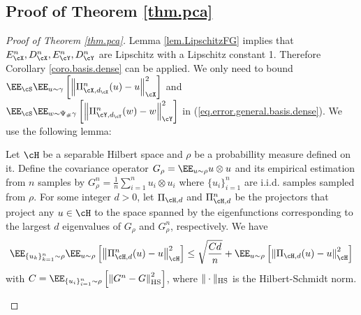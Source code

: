 \documentclass[11pt]{article} %
\begin{document}
\subsection{Proof of Theorem \ref{thm.pca}}
\label{thm.pca.proof}
\begin{proof}[Proof of Theorem \ref{thm.pca}]
Lemma \ref{lem.LipschitzFG} implies that $E_{\cX}^n,D_{\cX}^n,E_{\cY}^n,D_{\cY}^n$ are Lipschitz with a Lipschitz constant 1. Therefore Corollary \ref{coro.basis.dense} can be applied.
We only need to bound $\EE_{\cS}\EE_{u\sim \gamma}\left[\left\| \Pi_{\cX,d_{\cX}}^n(u)- u\right\|_{\cX}^2\right]$ and $\EE_{\cS}\EE_{w\sim \Psi_{\#}\gamma}\left[\left\|\Pi_{\cY,d_{\cY}}^n(w)- w\right\|_{\cY}^2\right]$ in (\ref{eq.error.general.basis.dense}).
We use the following lemma:
\begin{lemma}\label{lem.PCA.empirical}
	Let $\cH$ be a separable Hilbert space and $\rho$ be a probabillity measure defined on it. Define the covariance operator $G_{\rho}=\EE_{u\sim \rho} u\otimes u$ and its empirical estimation from $n$ samples by $G^n_{\rho}=\frac{1}{n} \sum_{i=1}^n u_i\otimes u_i$ where $\{u_i\}_{i=1}^n$ are i.i.d. samples sampled from $\rho$. For some integer $d>0$, let $\Pi_{\cH,d}$ and $ \Pi_{\cH,d}^n$ be the projectors that project any $u\in\cH$ to the space spanned by the eigenfunctions corresponding to the largest $d$ eigenvalues of $G_{\rho}$ and $G_{\rho}^n$, respectively.
	We have
	\begin{align}
		\EE_{\{u_k\}_{k=1}^n\sim \rho}\EE_{u\sim\rho} \left[ \left\|\Pi_{\cH,d}^n(u)-u\right\|_{\cH}^2\right]\leq \sqrt{\frac{Cd}{n}}+\EE_{u\sim\rho}\left[\left \|\Pi_{\cH,d}(u)-u\right\|_{\cH}^2\right]
	\end{align}
	with $C=\EE_{\{u_i\}_{i=1}^n\sim \rho}\left[\left\|G^n-G\right\|_{\rm HS}^2\right]$, where $\|\cdot\|_{\rm HS}$ is the Hilbert-Schmidt norm.
\end{lemma}





\end{proof}
\end{document}
